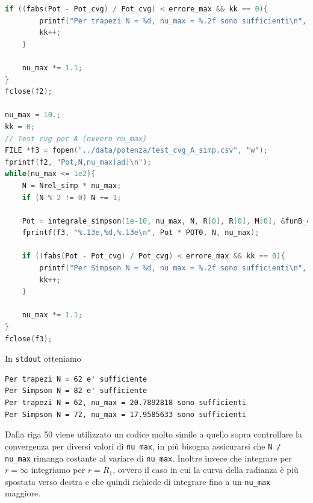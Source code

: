 \documentclass[a4paper, titlepage]{article}
\begin{document}
\begin{lstlisting}[language=C]
    if ((fabs(Pot - Pot_cvg) / Pot_cvg) < errore_max && kk == 0){
        printf("Per trapezi N = %d, nu_max = %.2f sono sufficienti\n", N, nu_max);
        kk++;
    }

    nu_max *= 1.1;
}
fclose(f2);

nu_max = 10.;
kk = 0;
// Test cvg per A (ovvero nu_max)
FILE *f3 = fopen("../data/potenza/test_cvg_A_simp.csv", "w");
fprintf(f2, "Pot,N,nu_max[ad]\n");
while(nu_max <= 1e2){
    N = Nrel_simp * nu_max;
    if (N % 2 != 0) N += 1;

    Pot = integrale_simpson(1e-10, nu_max, N, R[0], R[0], M[0], &funB_corrected);
    fprintf(f3, "%.13e,%d,%.13e\n", Pot * POT0, N, nu_max);

    if ((fabs(Pot - Pot_cvg) / Pot_cvg) < errore_max && kk == 0){
        printf("Per Simpson N = %d, nu_max = %.2f sono sufficienti\n", N, nu_max);
        kk++;
    }

    nu_max *= 1.1;
}
fclose(f3);
\end{lstlisting}

In \texttt{stdout} otteniamo

\begin{lstlisting}
Per trapezi N = 62 e' sufficiente
Per Simpson N = 82 e' sufficiente
Per trapezi N = 62, nu_max = 20.7892818 sono sufficienti
Per Simpson N = 72, nu_max = 17.9585633 sono sufficienti
\end{lstlisting}

Dalla riga 50 viene utilizzato un codice molto simile a quello sopra controllare la convergenza per diversi valori di \texttt{nu\_max}, in più bisogna assicurarsi che \texttt{N / nu\_max} rimanga costante al variare di \texttt{nu\_max}.
Inoltre invece che integrare per $r = \infty$ integriamo per $r = R_1$, ovvero il caso in cui la curva della radianza è più spostata verso destra e che quindi richiede di integrare fino a un \texttt{nu\_max} maggiore.
\end{document}
